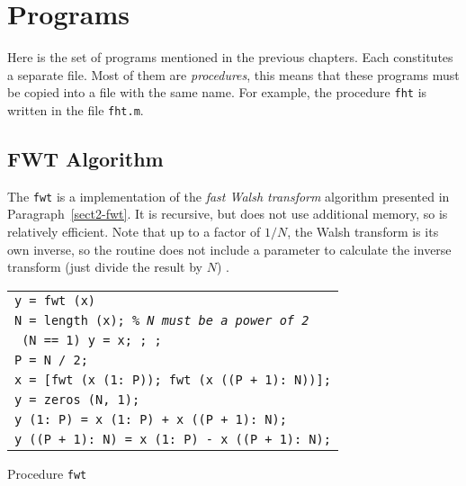  
\chapter{\Matlab{} Programs}
 
 
Here is the set of \Matlab{} programs mentioned in the previous chapters. Each \listingterme{} constitutes a separate file. Most of them are \textit{procedures}, this means that these programs must be copied into a file with the same name. For example, the procedure \texttt{fht} is written in the file \texttt{fht.m}.
 
\section{FWT Algorithm}
\label{sect1-listing-fwt}
 
  The \listingterme{} \texttt{fwt} is a \Matlab{} implementation of the \textit{fast Walsh transform} algorithm presented in Paragraph~\ref{sect2-fwt}. It is recursive, but does not use additional memory, so is relatively efficient. Note that up to a factor of $ 1 / N $, the Walsh transform is its own inverse, so the routine does not include a parameter to calculate the inverse transform (just divide the result by $ N $) .
\begin{listing} \begin{footnotesize}
 
 
\noindent
{\upshape
\begin{tabular}{l} \texttt{\pfunction y = fwt (x)} \\
\texttt{N = length (x); \textit{\% N must be a power of 2}} \\
\texttt{\pif{} (N == 1) y = x; \preturn{}; \pend{};} \\
\texttt{P = N / 2;} \\
\texttt{x = [fwt (x (1: P)); fwt (x ((P + 1): N))];} \\
\texttt{y = zeros (N, 1);} \\
\texttt{y (1: P) = x (1: P) + x ((P + 1): N);} \\
\texttt{y ((P + 1): N) = x (1: P) - x ((P + 1): N);} \\
\end{tabular}
}
 
\noindent \end{footnotesize}
 
\caption{Procedure \texttt{\upshape fwt}}
 
\label{listing-fwt}
\end{listing}
 
